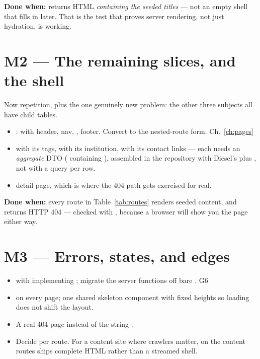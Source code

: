 \textbf{Done when:}  returns HTML \emph{containing the
seeded titles} --- not an empty shell that fills in later. That is the test that proves server
rendering, not just hydration, is working.

\section{M2 --- The remaining slices, and the shell}

Now repetition, plus the one genuinely new problem: the other three subjects all have child tables.

\begin{itemize}
  \item {}:  with header, nav, , footer. Convert
     to the nested-route form. Ch.~\ref{ch:pages}
  \item {} with its tags,  with its institution,
     with its contact links --- each needs an \emph{aggregate} DTO
    ( containing ), assembled in the repository with
    Diesel's  plus , not with a query per row.
  \item {} detail page, which is where the 404 path gets exercised for real.
\end{itemize}

\textbf{Done when:} every route in Table~\ref{tab:routes} renders seeded content, and
 returns HTTP 404 --- checked with , because a browser
will show you the page either way.

\section{M3 --- Errors, states, and edges}

\begin{itemize}
  \item {} with  implementing ; migrate the
    server functions off bare . G6
  \item {} on every page; one shared skeleton component with fixed heights so
    loading does not shift the layout.
  \item A real 404 page instead of the string .
  \item Decide  per route. For a content site where crawlers matter,
     on the content routes ships complete HTML rather than a streamed shell.
\end{itemize}

